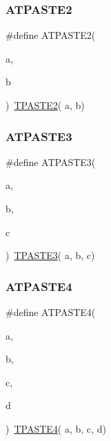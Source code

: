 \mbox{\label{group__group__sam0__utils__tpaste_gafd3b4e313492a0862292dc3072d8e347}} 
\subsubsection{\texorpdfstring{ATPASTE2}{ATPASTE2}}
{\footnotesize\ttfamily \#define A\+T\+P\+A\+S\+T\+E2(\begin{DoxyParamCaption}\item[{}]{a,  }\item[{}]{b }\end{DoxyParamCaption})~\mbox{\hyperlink{group__group__sam0__utils__tpaste_ga55fb148844f5ba993a992b609728e82e}{T\+P\+A\+S\+T\+E2}}( a, b)}

\mbox{\label{group__group__sam0__utils__tpaste_ga80b7594516326045fbcaec54d7759c20}} 
\subsubsection{\texorpdfstring{ATPASTE3}{ATPASTE3}}
{\footnotesize\ttfamily \#define A\+T\+P\+A\+S\+T\+E3(\begin{DoxyParamCaption}\item[{}]{a,  }\item[{}]{b,  }\item[{}]{c }\end{DoxyParamCaption})~\mbox{\hyperlink{group__group__sam0__utils__tpaste_ga3774e5e321825e6ab4a27fef2a0deb14}{T\+P\+A\+S\+T\+E3}}( a, b, c)}

\mbox{\label{group__group__sam0__utils__tpaste_gad9dcc51074148a4ff01810033a41e282}} 
\subsubsection{\texorpdfstring{ATPASTE4}{ATPASTE4}}
{\footnotesize\ttfamily \#define A\+T\+P\+A\+S\+T\+E4(\begin{DoxyParamCaption}\item[{}]{a,  }\item[{}]{b,  }\item[{}]{c,  }\item[{}]{d }\end{DoxyParamCaption})~\mbox{\hyperlink{group__group__sam0__utils__tpaste_ga7df52ac8ee04480944ef404ef9418b38}{T\+P\+A\+S\+T\+E4}}( a, b, c, d)}

